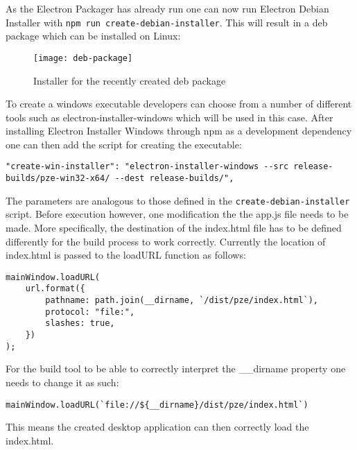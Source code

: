 As the Electron Packager has already run one can now run Electron Debian Installer with 
\lstinline[columns=fixed]{npm run create-debian-installer}.
This will result in a \acrshort{deb} package which can be installed on Linux:
\begin{figure}[H]
    \centering
    \label{fig:pze-deb-package}
    \texttt{[image: deb-package]}
    \caption{Installer for the recently created \acrshort{deb} package}
\end{figure}
To create a windows executable developers can choose from a number of different tools such as 
electron-installer-windows which will be used in this case.
After installing Electron Installer Windows through \acrshort{npm} as a development dependency one 
can then add the script for creating the executable:
\begin{lstlisting}[caption=Script for creating a windows executable.]
"create-win-installer": "electron-installer-windows --src release-builds/pze-win32-x64/ --dest release-builds/",
\end{lstlisting}
The parameters are analogous to those defined in the \lstinline[columns=fixed]{create-debian-installer} script.
Before execution however, one modification the the app.js file needs to be made.
More specifically, the destination of the index.html file has to be defined differently for the build process to 
work correctly. 
Currently the location of index.html is passed to the loadURL function as follows:
\begin{lstlisting}[caption=Passing index.html location to loadURL().]
mainWindow.loadURL(
    url.format({
        pathname: path.join(__dirname, `/dist/pze/index.html`),
        protocol: "file:",
        slashes: true,
    })
);
\end{lstlisting}
For the build tool to be able to correctly interpret the \_\_dirname property one needs 
to change it as such:
\begin{lstlisting}[caption=Passing index.html location to loadURL().]
mainWindow.loadURL(`file://${__dirname}/dist/pze/index.html`)
\end{lstlisting}
This means the created desktop application can then correctly load the index.html.
